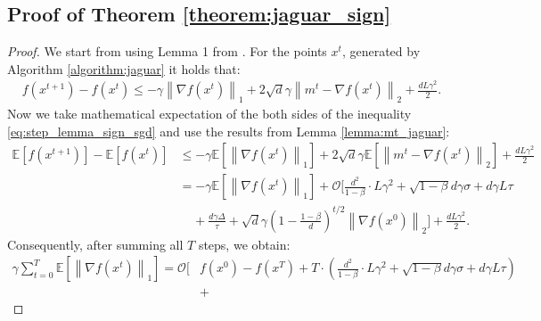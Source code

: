 \documentclass{article}
\theoremstyle{plain}
\theoremstyle{definition}
\theoremstyle{remark}
\newcommand{\expect}[1]{\mathbb{E}\left[ #1 \right]}
\newcommand{\norm}[1]{\left\| #1 \right\|}
\begin{document}
    \subsection{Proof of Theorem \ref{theorem:jaguar_sign}}
    \begin{proof}
        We start from using Lemma 1 from \cite{sun2023momentum}. For the points $x^t$, generated by Algorithm \ref{algorithm:jaguar} it holds that:
        \begin{align}
        \label{eq:step_lemma_sign_sgd}
            f(x^{t+1}) - f(x^t) 
            \leq
            - \gamma \norm{\nabla f(x^t)}_1
            +
            2 \sqrt{d} \gamma \norm{m^t - \nabla f(x^t)}_2
            +
            \frac{d L \gamma^2}{2} .
        \end{align}
        Now we take mathematical expectation of the both sides of the inequality \eqref{eq:step_lemma_sign_sgd} and use the results from Lemma \ref{lemma:mt_jaguar}:
        \begin{align*}
        \label{eq:step_lemma_sign_sgd}
            \expect{f(x^{t+1})} - \expect{f(x^t)}
            &\leq
            - \gamma \expect{\norm{\nabla f(x^t)}_1}
            +
            2 \sqrt{d} \gamma \expect{\norm{m^t - \nabla f(x^t)}_2}
            +
            \frac{d L \gamma^2}{2}
            \\&=
            - \gamma \expect{\norm{\nabla f(x^t)}_1}
            +
            \mathcal{O} \Bigg[ 
                \frac{d^2}{1-\beta}\cdot L \gamma^2  
                +
                \sqrt{1-\beta}d \gamma \sigma
                +
                d \gamma L \tau
                \\&~~~~~+
                \frac{d \gamma \Delta}{\tau} 
                + 
                \sqrt{d} \gamma \left( 1 - \frac{1 - \beta}{d} \right)^{t/2} \norm{\nabla f(x^0)}_2
            \Bigg] +
            \frac{d L \gamma^2}{2} .
        \end{align*}
        Consequently, after summing all $T$ steps, we obtain:
        \begin{equation}
        \label{eq:tmp_1111}
        \begin{split}
            \gamma \sum_{t=0}^T \expect{\norm{\nabla f(x^t)}_1}
            =
            \mathcal{O} \Bigg[ 
                &f(x^0) - f(x^T)
                +
                T \cdot \left( \frac{d^2}{1-\beta}\cdot L \gamma^2  
                +
                \sqrt{1-\beta}d \gamma \sigma
                +
                d \gamma L \tau
                \right)
                \\&+

\end{split}
\end{equation}
\end{proof}
\end{document}
